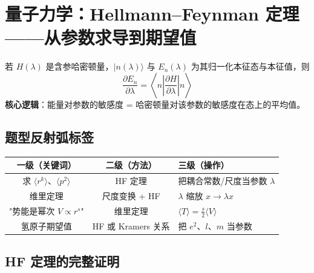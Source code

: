 
\section{量子力学：Hellmann--Feynman 定理——从参数求导到期望值}
\label{sec:hellmann-feynman}

\begin{modelbox}[HF 定理：一句话版]
若 $H(\lambda)$ 是含参哈密顿量，$|n(\lambda)\rangle$ 与 $E_n(\lambda)$ 为其归一化本征态与本征值，则
\[
\boxed{\frac{\partial E_n}{\partial \lambda} = \left\langle n\left|\frac{\partial H}{\partial \lambda}\right|n\right\rangle}
\]
\textbf{核心逻辑}：能量对参数的敏感度 = 哈密顿量对该参数的敏感度在态上的平均值。
\end{modelbox}

\subsection{题型反射弧标签}

\begin{tipbox}
\begin{center}
\renewcommand{\arraystretch}{1.5}
\begin{tabular}{|c|c|l|}
\hline
\textbf{一级（关键词）} & \textbf{二级（方法）} & \textbf{三级（操作）} \\
\hline
求 $\langle r^k \rangle$、$\langle p^2 \rangle$ & HF 定理 & 把耦合常数/尺度当参数 $\lambda$ \\
\hline
维里定理 & 尺度变换 + HF & $\lambda$ 缩放 $x \to \lambda x$ \\
\hline
"势能是幂次 $V \propto r^s$" & 维里定理 & $\langle T \rangle = \frac{s}{2}\langle V \rangle$ \\
\hline
氢原子期望值 & HF 或 Kramers 关系 & 把 $e^2$、$l$、$m$ 当参数 \\
\hline
\end{tabular}
\end{center}
\end{tipbox}

\subsection{HF 定理的完整证明}


